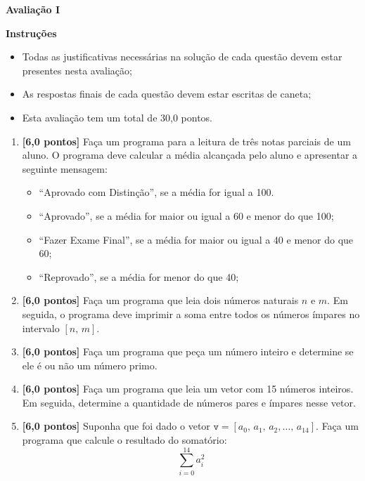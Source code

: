 \documentclass[12pt,a4paper]{article}
\begin{document}
\begin{center}
 \textbf{Avaliação I}
\end{center}

\textbf{Instruções}
\begin{itemize}
 \item Todas as justificativas necessárias na solução de cada questão devem 
 estar presentes nesta avaliação;
 \item As respostas finais de cada questão devem estar escritas de caneta;
 \item Esta avaliação tem um total de 30,0 pontos.
\end{itemize}

\begin{enumerate}
  \item \textbf{[6,0 pontos]} Faça um programa para a leitura de três notas parciais de um aluno.
  O programa deve calcular a média alcançada pelo aluno e apresentar a seguinte mensagem:
    \begin{itemize}
      \item ``Aprovado com Distinção'', se a média for igual a 100.
      \item ``Aprovado'', se a média for maior ou igual a 60 e menor do que 100;
      \item ``Fazer Exame Final'', se a média for maior ou igual a 40 e menor do que 60;
      \item ``Reprovado'', se a média for menor do que 40;
    \end{itemize}

  \item \textbf{[6,0 pontos]} Faça um programa que leia dois números naturais $n$ e $m$.
  Em seguida, o programa deve imprimir a soma entre todos os números ímpares no intervalo
  $[n,\, m]$.
  
  \item \textbf{[6,0 pontos]} Faça um programa que peça um número inteiro e determine se
  ele é ou não um número primo.

  \item \textbf{[6,0 pontos]} Faça um programa que leia um vetor com 15 números inteiros.
  Em seguida, determine a quantidade de números pares e ímpares nesse vetor.

  \item \textbf{[6,0 pontos]} Suponha que foi dado o vetor 
  $\texttt{v} = [a_0,\, a_1,\, a_2, \ldots,\, a_{14}]$. Faça um programa que calcule o
  resultado do somatório:
  $$\sum_{i = 0}^{14} a_i^2$$

\end{enumerate}
\end{document}
